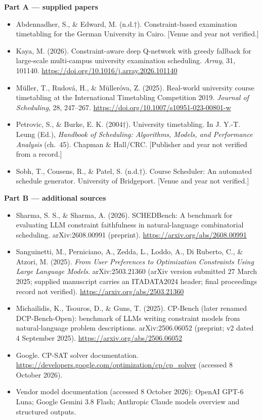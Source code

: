 \documentclass[
  11pt,a4paper,oneside]{report}
\begin{document}
\medskip\noindent\textbf{Part A --- supplied papers}
\begin{itemize}\setlength{\itemsep}{3pt}
\item Abdennadher, S., \& Edward, M. (n.d.$\dagger$). Constraint-based examination timetabling for the German University in Cairo. [Venue and year not verified.]
\item Kaya, M. (2026). Constraint-aware deep Q-network with greedy fallback for large-scale multi-campus university examination scheduling. \emph{Array}, 31, 101140. \url{https://doi.org/10.1016/j.array.2026.101140}
\item M\"uller, T., Rudov\'a, H., \& M\"uller\'ova, Z. (2025). Real-world university course timetabling at the International Timetabling Competition 2019. \emph{Journal of Scheduling}, 28, 247--267. \url{https://doi.org/10.1007/s10951-023-00801-w}
\item Petrovic, S., \& Burke, E. K. (2004$\dagger$). University timetabling. In J. Y.-T. Leung (Ed.), \emph{Handbook of Scheduling: Algorithms, Models, and Performance Analysis} (ch.~45). Chapman \& Hall/CRC. [Publisher and year not verified from a record.]
\item Sobh, T., Cousens, R., \& Patel, S. (n.d.$\dagger$). Course Scheduler: An automated schedule generator. University of Bridgeport. [Venue and year not verified.]
\end{itemize}

\noindent\textbf{Part B --- additional sources}
\begin{itemize}\setlength{\itemsep}{3pt}
\item Sharma, S. S., \& Sharma, A. (2026). SCHEDBench: A benchmark for evaluating LLM constraint faithfulness in natural-language combinatorial scheduling. arXiv:2608.00991 (preprint). \url{https://arxiv.org/abs/2608.00991}
\item Sanguinetti, M., Perniciano, A., Zedda, L., Loddo, A., Di Ruberto, C., \& Atzori, M. (2025). \emph{From User Preferences to Optimization Constraints Using Large Language Models}. arXiv:2503.21360 (arXiv version submitted 27 March 2025; supplied manuscript carries an ITADATA2024 header; final proceedings record not verified). \url{https://arxiv.org/abs/2503.21360}
\item Michailidis, K., Tsouros, D., \& Guns, T. (2025). CP-Bench (later renamed DCP-Bench-Open): benchmark of LLMs writing constraint models from natural-language problem descriptions. arXiv:2506.06052 (preprint; v2 dated 4 September 2025). \url{https://arxiv.org/abs/2506.06052}
\item Google. CP-SAT solver documentation. \url{https://developers.google.com/optimization/cp/cp_solver} (accessed 8 October 2026).
\item Vendor model documentation (accessed 8 October 2026): OpenAI GPT-6 Luna; Google Gemini 3.8 Flash; Anthropic Claude models overview and structured outputs.
\end{itemize}
\end{document}
